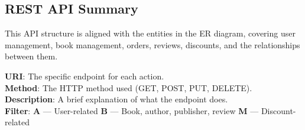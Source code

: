 \subsection{REST API Summary}

This API structure is aligned with the entities in the ER diagram, covering user management, book management, orders, reviews, discounts, and the relationships between them.

\textbf{URI}: The specific endpoint for each action. \\
\textbf{Method}: The HTTP method used (GET, POST, PUT, DELETE). \\
\textbf{Description}: A brief explanation of what the endpoint does. \\
\textbf{Filter}: \textbf{A} — User-related \quad \textbf{B} — Book, author, publisher, review \quad \textbf{M} — Discount-related

